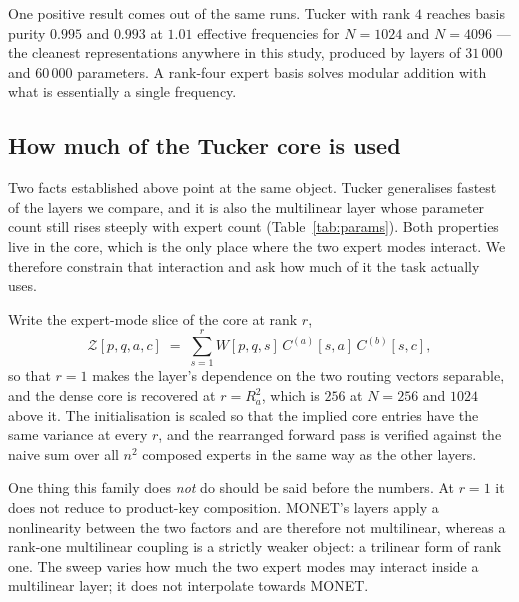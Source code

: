 One positive result comes out of the same runs. Tucker with rank $4$ reaches
basis purity $0.995$ and $0.993$ at $1.01$ effective frequencies for
$N = 1024$ and $N = 4096$ --- the cleanest representations anywhere in this
study, produced by layers of $31\,000$ and $60\,000$ parameters. A rank-four
expert basis solves modular addition with what is essentially a single
frequency.

\subsection{How much of the Tucker core is used}
\label{sec:res-comp}

Two facts established above point at the same object. Tucker generalises
fastest of the layers we compare, and it is also the multilinear layer whose
parameter count still rises steeply with expert count
(Table~\ref{tab:params}). Both properties live in the core, which is the only
place where the two expert modes interact. We therefore constrain that
interaction and ask how much of it the task actually uses.

Write the expert-mode slice of the core at rank $r$,
\begin{equation}
\mathcal{Z}[p, q, a, c]
  \;=\; \sum_{s=1}^{r} W[p, q, s]\, C^{(a)}[s, a]\, C^{(b)}[s, c],
\end{equation}
so that $r = 1$ makes the layer's dependence on the two routing vectors
separable, and the dense core is recovered at $r = R_a^2$, which is $256$ at
$N = 256$ and $1024$ above it. The initialisation is scaled so that the
implied core entries have the same variance at every $r$, and the rearranged
forward pass is verified against the naive sum over all $n^2$ composed experts
in the same way as the other layers.

One thing this family does \emph{not} do should be said before the numbers.
At $r = 1$ it does not reduce to product-key composition. MONET's layers apply
a nonlinearity between the two factors and are therefore not multilinear,
whereas a rank-one multilinear coupling is a strictly weaker object: a
trilinear form of rank one. The sweep varies how much the two expert modes may
interact inside a multilinear layer; it does not interpolate towards MONET.

